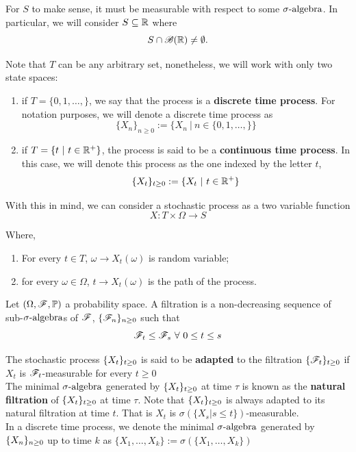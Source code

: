 \documentclass[../TGMAFFIRO.tex]{subfiles}
\begin{document}
For $S$ to make sense, it must be measurable with respect to some $\sigma\text{-algebra}$. In particular, we will consider $S \subseteq \mathbb{R}$ where
\[
	S \cap \mathscr{B}(\mathbb{R}) \neq \emptyset.
\]

Note that $T$ can be any arbitrary set, nonetheless, we will work with only two state spaces:
\begin{enumerate}
	\item if $T = \{0, 1, \ldots, \}$, we say that the process is a \textbf{discrete time process}. For notation purposes, we will denote a discrete time process as
	\begin{equation}
		\{X_n\}_{n\geq 0}:= \{X_n \ | \ n \in \{0, 1, \ldots, \}\}
	\end{equation}
	
	\item if $T = \{t \ | \ t\in\RNums^+\}$, the process is said to be a \textbf{continuous time process}. In this case, we will denote this process as the one indexed by the letter $t$,
	\begin{equation}
		\{X_t\}_{t\geq 0} := \{X_t \ | \ t \in \mathbb{R}^+\}
	\end{equation}
\end{enumerate}

With this in mind, we can consider a stochastic process as a two variable function
\[
	X: T\times\Omega \to S
\]

Where,
\begin{enumerate}
	\item For every $t\in T$, $\omega \to X_t(\omega)$ is random variable;
	\item for every $\omega \in \Omega$, $t \to X_t(\omega)$ is the path of the process.
\end{enumerate}


\begin{definition}
Let $(\Omega, \mathscr{F}, \mathbb{P})$ a probability space. A filtration is a non-decreasing sequence of sub-$\sigma\text{-algebra}$s of $\mathscr{F}$, $\{\mathscr{F}_n\}_{n\geq 0}$ such that 
\[
	\mathscr{F}_t \leq \mathscr{F}_s \ \forall \ 0 \leq t \leq s
\]
\end{definition}

The stochastic process $\{X_t\}_{t\geq 0}$ is said to be \textbf{adapted} to the filtration $\{\mathscr{F}_t\}_{t\geq 0}$ if $X_t$ is $\mathscr{F}_t$-measurable for every $t\geq 0$\\

The minimal $\sigma\text{-algebra}$ generated by $\{X_t\}_{t\geq 0}$ at time $\tau$ is known as the \textbf{natural filtration} of $\{X_t\}_{t\geq 0}$ at time $\tau$. Note that $\{X_t\}_{t\geq 0}$ is always adapted to its natural filtration at time $t$. That is $X_t$ is $\sigma(\{X_s | s \leq t\})$-measurable.\\

In a discrete time process, we denote the minimal $\sigma\text{-algebra}$ generated by $\{X_n\}_{n\geq 0}$ up to time $k$ as $\{X_1, \ldots, X_k\} := \sigma(\{X_1, \ldots, X_k\})$

	
\end{document}
